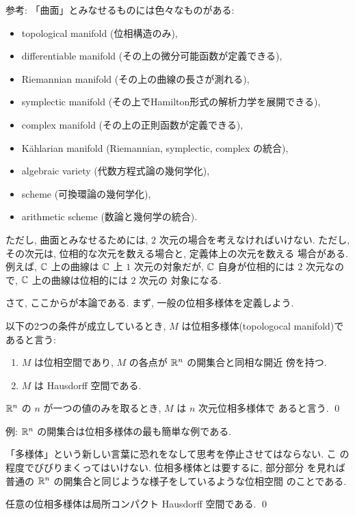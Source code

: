 \documentclass[12pt,twoside]{jarticle}
\def\R{{\Bbb R}} %
\def\C{{\Bbb C}} %
\begin{document}
\noindent 参考: 「曲面」とみなせるものには色々なものがある:
\begin{itemize}
\item topological manifold
  \quad
  (位相構造のみ),
\item differentiable manifold
  \quad
  (その上の微分可能函数が定義できる),
\item Riemannian manifold
  \quad
  (その上の曲線の長さが測れる),
\item symplectic manifold
  \quad
  (その上でHamilton形式の解析力学を展開できる),
\item complex manifold
  \quad
  (その上の正則函数が定義できる),
\item K\"ahlarian manifold
  \quad
  (Riemannian, symplectic, complex の統合),
\item algebraic variety
  \quad
  (代数方程式論の幾何学化),
\item scheme
  \quad
  (可換環論の幾何学化),
\item arithmetic scheme
  \quad
  (数論と幾何学の統合).
\end{itemize}
ただし, 曲面とみなせるためには, $2$ 次元の場合を考えなければいけない. 
ただし, その次元は, 位相的な次元を数える場合と, 定義体上の次元を数える
場合がある. 例えば, $\C$ 上の曲線は $\C$ 上 $1$ 次元の対象だが, $\C$ 
自身が位相的には $2$ 次元なので, $\C$ 上の曲線は位相的には $2$ 次元の
対象になる.

さて, ここからが本論である. まず, 一般の位相多様体を定義しよう.

\begin{Definition}[位相多様体]
  以下の2つの条件が成立しているとき, $M$ は位相多様体(topologocal
  manifold)であると言う:
  \begin{enumerate}
  \item $M$ は位相空間であり, $M$ の各点が $\R^n$ の開集合と同相な開近
    傍を持つ.
  \item $M$ は Hausdorff 空間である.
  \end{enumerate}
  $\R^n$ の $n$ が一つの値のみを取るとき, $M$ は $n$ 次元位相多様体で
  あると言う. \qed
\end{Definition}

\noindent 例: $\R^n$ の開集合は位相多様体の最も簡単な例である.

「多様体」という新しい言葉に恐れをなして思考を停止させてはならない. こ
の程度でびびりまくってはいけない.  位相多様体とは要するに, 部分部分
を見れば普通の $\R^n$ の開集合と同じような様子をしているような位相空間
のことである.

\begin{question}
  任意の位相多様体は局所コンパクト Hausdorff 空間である. \qed
\end{question}
\end{document}
